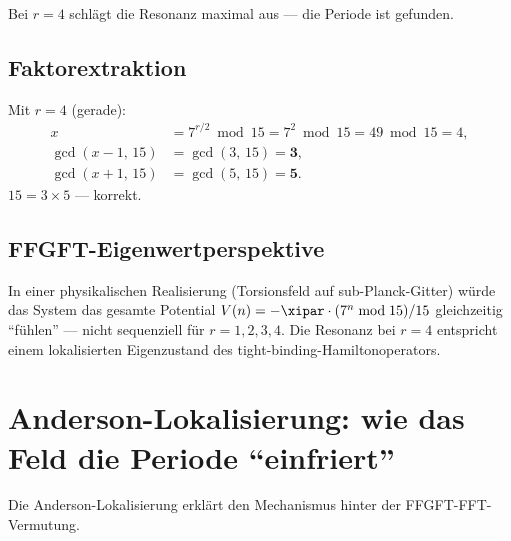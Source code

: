 \begin{center}
\end{center}

Bei $r = 4$ schlägt die Resonanz maximal aus ---
die Periode ist gefunden.

\subsection{Faktorextraktion}

Mit $r = 4$ (gerade):
\begin{align}
  x &= 7^{r/2} \bmod 15 = 7^2 \bmod 15 = 49 \bmod 15 = 4, \\
  \gcd(x-1,\,15) &= \gcd(3,\,15) = \mathbf{3}, \\
  \gcd(x+1,\,15) &= \gcd(5,\,15) = \mathbf{5}.
\end{align}
$15 = 3 \times 5$ --- korrekt.

\subsection{FFGFT-Eigenwertperspektive}

In einer physikalischen Realisierung
(Torsionsfeld auf sub-Planck-Gitter)
würde das System das gesamte Potential
$V(n) = -\xipar \cdot (7^n \bmod 15)/15$
gleichzeitig ``fühlen'' ---
nicht sequenziell für $r = 1, 2, 3, 4$.
Die Resonanz bei $r = 4$ entspricht einem
lokalisierten Eigenzustand des
tight-binding-Hamiltonoperators.

\section{Anderson-Lokalisierung: wie das Feld
  die Periode ``einfriert''}
\label{sec:anderson-detail}

Die Anderson-Lokalisierung erklärt den Mechanismus
hinter der FFGFT-FFT-Vermutung.

